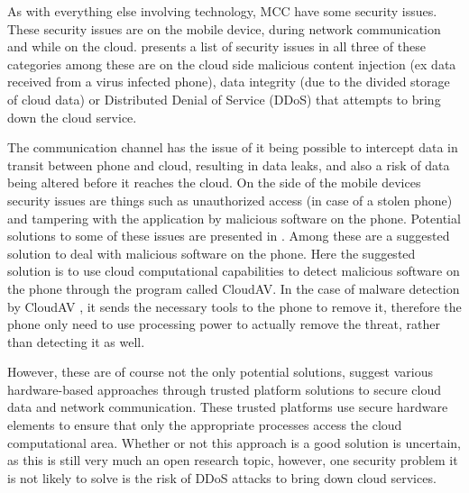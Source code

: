 As with everything else involving technology, MCC have some security issues.
These security issues are on the mobile device, during network communication and while on the cloud.
\citet{6923101} presents a list of security issues in all three of these categories among these are on the cloud side malicious content injection (ex data received from a virus infected phone), data integrity (due to the divided storage of cloud data) or Distributed Denial of Service (DDoS) that attempts to bring down the cloud service.

The communication channel has the issue of it being possible to intercept data in transit between phone and cloud, resulting in data leaks, and also a risk of data being altered before it reaches the cloud.
On the side of the mobile devices security issues are things such as unauthorized access (in case of a stolen phone) and tampering with the application by malicious software on the phone.
Potential solutions to some of these issues are presented in \citet{6583635}.
Among these are a suggested solution to deal with malicious software on the phone.
Here the suggested solution is to use cloud computational capabilities to detect malicious software on the phone through the program called CloudAV.
In the case of malware detection by CloudAV \citep{Oberheide:2008:CNA:1496711.1496718}, it sends the necessary tools to the phone to remove it, therefore the phone only need to use processing power to actually remove the threat, rather than detecting it as well.

However, these are of course not the only potential solutions, \citet{7056876} suggest various hardware-based approaches through trusted platform solutions to secure cloud data and network communication.
These trusted platforms use secure hardware elements to ensure that only the appropriate processes access the cloud computational area.
Whether or not this approach is a good solution is uncertain, as this is still very much an open research topic, however, one security problem it is not likely to solve is the risk of DDoS attacks to bring down cloud services.

